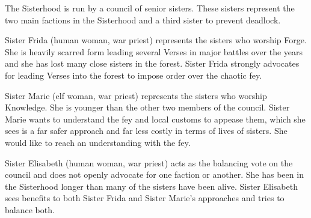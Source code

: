 The Sisterhood is run by a council of senior sisters.
These sisters represent the two main factions in the Sisterhood and a third sister to prevent deadlock.

Sister Frida (human woman, war priest) represents the sisters who worship Forge.
She is heavily scarred form leading several Verses in major battles over the years and she has lost many close sisters in the forest.
Sister Frida strongly advocates for leading Verses into the forest to impose order over the chaotic fey.

Sister Marie (elf woman, war priest) represents the sisters who worship Knowledge.
She is younger than the other two members of the council.
Sister Marie wants to understand the fey and local customs to appease them, which she sees is a far safer approach and far less costly in terms of lives of sisters.
She would like to reach an understanding with the fey.

Sister Elisabeth (human woman, war priest) acts as the balancing vote on the council and does not openly advocate for one faction or another.
She has been in the Sisterhood longer than many of the sisters have been alive.
Sister Elisabeth sees benefits to both Sister Frida and Sister Marie's approaches and tries to balance both.
